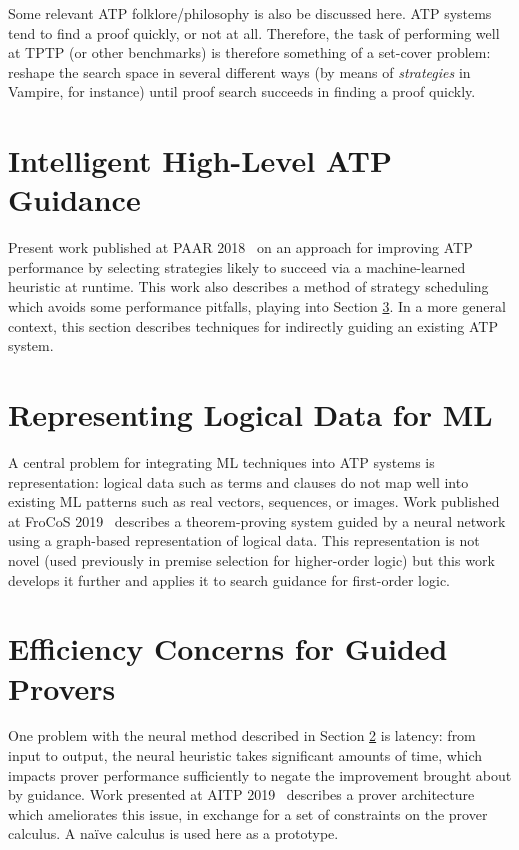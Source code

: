\documentclass[a4paper]{article}
\begin{document}
\noindent
Some relevant ATP folklore/philosophy is also be discussed here.
ATP systems tend to find a proof quickly, or not at all.
Therefore, the task of performing well at TPTP (or other benchmarks) is therefore something of a set-cover problem: reshape the search space in several different ways (by means of \emph{strategies} in Vampire, for instance) until proof search succeeds in finding a proof quickly.

\section{Intelligent High-Level ATP Guidance}
Present work published at PAAR 2018~\cite{paar2018} on an approach for improving ATP performance by selecting strategies likely to succeed via a machine-learned heuristic at runtime.
This work also describes a method of strategy scheduling which avoids some performance pitfalls, playing into Section \ref{sec:efficiency}.
In a more general context, this section describes techniques for indirectly guiding an existing ATP system.

\section{Representing Logical Data for ML}
\label{sec:representation}
A central problem for integrating ML techniques into ATP systems is representation: logical data such as terms and clauses do not map well into existing ML patterns such as real vectors, sequences, or images.
Work published at FroCoS 2019~\cite{frocos2019} describes a theorem-proving system guided by a neural network using a graph-based representation of logical data.
This representation is not novel (used previously in premise selection for higher-order logic) but this work develops it further and applies it to search guidance for first-order logic.

\section{Efficiency Concerns for Guided Provers}
\label{sec:efficiency}
One problem with the neural method described in Section \ref{sec:representation} is latency: from input to output, the neural heuristic takes significant amounts of time, which impacts prover performance sufficiently to negate the improvement brought about by guidance.
Work presented at AITP 2019~\cite{aitp2019} describes a prover architecture which ameliorates this issue, in exchange for a set of constraints on the prover calculus.
A na\"ive calculus is used here as a prototype.
\end{document}
